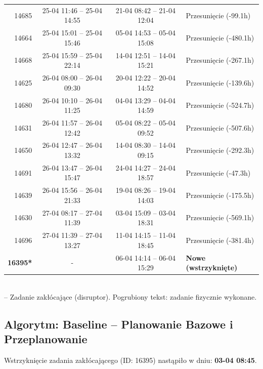 \begin{table}[htbp]
\begin{tabular}{|r|c|c|l|}
14685 & 25-04 11:46 -- 25-04 14:55 & 21-04 08:42 -- 21-04 12:04 & Przesunięcie (-99.1h) \\ 
14664 & 25-04 15:01 -- 25-04 15:46 & 05-04 14:53 -- 05-04 15:08 & Przesunięcie (-480.1h) \\ 
14668 & 25-04 15:59 -- 25-04 22:14 & 14-04 12:51 -- 14-04 15:21 & Przesunięcie (-267.1h) \\ 
14625 & 26-04 08:00 -- 26-04 09:30 & 20-04 12:22 -- 20-04 14:52 & Przesunięcie (-139.6h) \\ 
14680 & 26-04 10:10 -- 26-04 11:25 & 04-04 13:29 -- 04-04 14:59 & Przesunięcie (-524.7h) \\ 
14631 & 26-04 11:57 -- 26-04 12:42 & 05-04 08:22 -- 05-04 09:52 & Przesunięcie (-507.6h) \\ 
14650 & 26-04 12:47 -- 26-04 13:32 & 14-04 08:30 -- 14-04 09:15 & Przesunięcie (-292.3h) \\ 
14691 & 26-04 13:47 -- 26-04 15:47 & 24-04 14:27 -- 24-04 18:57 & Przesunięcie (-47.3h) \\ 
14639 & 26-04 15:56 -- 26-04 21:33 & 19-04 08:26 -- 19-04 14:03 & Przesunięcie (-175.5h) \\ 
14630 & 27-04 08:17 -- 27-04 11:39 & 03-04 15:09 -- 03-04 18:31 & Przesunięcie (-569.1h) \\ 
14696 & 27-04 11:39 -- 27-04 13:27 & 11-04 14:15 -- 11-04 18:45 & Przesunięcie (-381.4h) \\ 
\hline
\textbf{16395*} & - & 06-04 14:14 -- 06-04 15:29 & \textbf{Nowe (wstrzyknięte)} \\ 
\hline
\end{tabular}
\\ {\footnotesize * -- Zadanie zakłócające (disruptor). Pogrubiony tekst: zadanie fizycznie wykonane.}
\end{table}

\vspace{0.8cm}
\subsection{Algorytm: Baseline -- Planowanie Bazowe i Przeplanowanie}

Wstrzyknięcie zadania zakłócającego (ID: 16395) nastąpiło w dniu: \textbf{03-04 08:45}.

